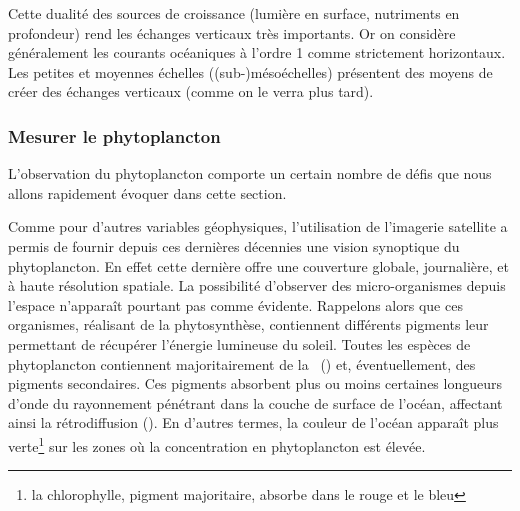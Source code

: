 Cette dualité des sources de croissance (lumière en surface, nutriments en profondeur) rend les échanges verticaux très importants.
Or on considère généralement les courants océaniques à l'ordre 1 comme strictement horizontaux.
Les petites et moyennes échelles ((sub-)mésoéchelles) présentent des moyens de créer des échanges verticaux (comme on le verra plus tard).

\subsubsection{Mesurer le phytoplancton}
\label{sec:teledetection}

\begin{figure}
  \centering

  \label{fig:oc-fine-illustration}
\end{figure}

L'observation du phytoplancton comporte un certain nombre de défis que nous allons rapidement évoquer dans cette section.

Comme pour d'autres variables géophysiques, l'utilisation de l'imagerie satellite a permis de fournir depuis ces dernières décennies une vision synoptique du phytoplancton.
En effet cette dernière offre une couverture globale, journalière, et à haute résolution spatiale.
La possibilité d'observer des micro-organismes depuis l'espace n'apparaît pourtant pas comme évidente.
Rappelons alors que ces organismes, réalisant de la phytosynthèse, contiennent différents pigments leur permettant de récupérer l'énergie lumineuse du soleil.
Toutes les espèces de phytoplancton contiennent majoritairement de la ~() et, éventuellement, des pigments secondaires.
Ces pigments absorbent plus ou moins certaines longueurs d'onde du rayonnement pénétrant dans la couche de surface de l'océan, affectant ainsi la rétrodiffusion ().
En d'autres termes, la couleur de l'océan apparaît plus verte\footnote{%
  la chlorophylle, pigment majoritaire, absorbe dans le rouge et le bleu}
sur les zones où la concentration en phytoplancton est élevée.

